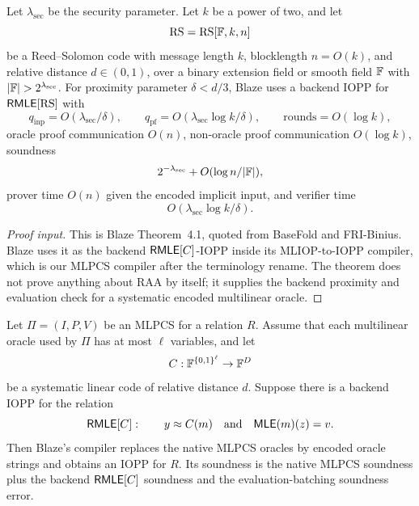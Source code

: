 \begin{theorem}
\label{thm:blaze-backend-rmle-input}
Let \(\lambda_{\mathrm{sec}}\) be the security parameter.  Let \(k\) be a power
of two, and let
\[
  \mathrm{RS}=\mathrm{RS}[\mathbb{F},k,n]
\]
be a Reed--Solomon code with message length \(k\), blocklength \(n=O(k)\), and
relative distance \(d\in(0,1)\), over a binary extension field or smooth field
\(\mathbb{F}\) with \(|\F|>2^{\lambda_{\mathrm{sec}}}\).  For proximity parameter
\(\delta<d/3\), Blaze uses a backend IOPP for \(\mathsf{RMLE}[\mathrm{RS}]\) with
\[
  q_{\mathrm{inp}}=O(\lambda_{\mathrm{sec}}/\delta),
  \qquad
  q_{\mathrm{pf}}=O(\lambda_{\mathrm{sec}}\log k/\delta),
  \qquad
  \mathrm{rounds}=O(\log k),
\]
oracle proof communication \(O(n)\), non-oracle proof communication
\(O(\log k)\), soundness
\[
  2^{-\lambda_{\mathrm{sec}}}+O(\log n/|\mathbb{F}|),
\]
prover time \(O(n)\) given the encoded implicit input, and verifier time
\[
  O(\lambda_{\mathrm{sec}}\log k/\delta).
\]
\end{theorem}

\begin{proof}[Proof input]
This is Blaze Theorem~4.1, quoted from BaseFold and FRI-Binius.  Blaze uses it
as the backend \(\mathsf{RMLE}[C]\)-IOPP inside its MLIOP-to-IOPP compiler, which is
our MLPCS compiler after the terminology rename.  The theorem
does not prove anything about RAA by itself; it supplies the backend proximity
and evaluation check for a systematic encoded multilinear oracle.
\end{proof}

\begin{lemma}
\label{lem:blaze-mlpcs-compiler-replay}
Let \(\Pi=(I,P,V)\) be an MLPCS for a relation \(R\).  Assume that each
multilinear oracle used by \(\Pi\) has at most \(\ell\) variables, and let
\[
  C:\mathbb{F}^{\{0,1\}^\ell}\to\mathbb{F}^D
\]
be a systematic linear code of relative distance \(d\).  Suppose there is a
backend IOPP for the relation
\[
  \mathsf{RMLE}[C]:
  \qquad
  y\approx C(m)
  \quad\text{and}\quad
  \mathsf{MLE}(m)(z)=v.
\]
Then Blaze's compiler replaces the native MLPCS oracles by encoded oracle
strings and obtains an IOPP for \(R\).  Its soundness is the native MLPCS
soundness plus the backend \(\mathsf{RMLE}[C]\) soundness and the evaluation-batching
soundness error.
\end{lemma}

